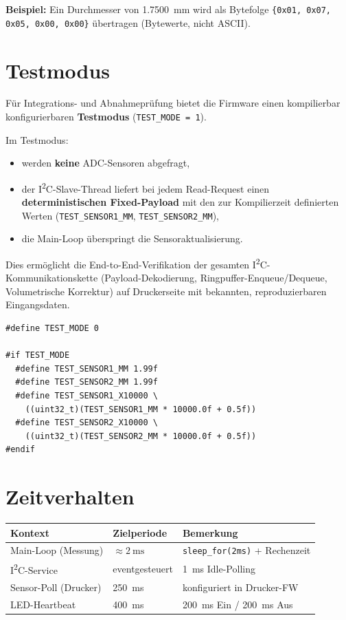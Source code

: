 \textbf{Beispiel:} Ein Durchmesser von \qty{1,7500}{\milli\meter} wird als Bytefolge \texttt{\{0x01, 0x07, 0x05, 0x00, 0x00\}} übertragen (Bytewerte, nicht ASCII).

\section{Testmodus}
\label{sec:sensor_testmodus}

Für Integrations- und Abnahmeprüfung bietet die Firmware einen kompilierbar konfigurierbaren \textbf{Testmodus} (\texttt{TEST\_MODE~=~1}).

Im Testmodus:
\begin{itemize}
  \item werden \textbf{keine} ADC-Sensoren abgefragt,
  \item der I\textsuperscript{2}C-Slave-Thread liefert bei jedem Read-Request einen \textbf{deterministischen Fixed-Payload} mit den zur Kompilierzeit definierten Werten (\texttt{TEST\_SENSOR1\_MM}, \texttt{TEST\_SENSOR2\_MM}),
  \item die Main-Loop überspringt die Sensoraktualisierung.
\end{itemize}

Dies ermöglicht die End-to-End-Verifikation der gesamten I\textsuperscript{2}C-Kommunikationskette (Payload-Dekodierung, Ringpuffer-Enqueue/Dequeue, Volumetrische Korrektur) auf Druckerseite mit bekannten, reproduzierbaren Eingangsdaten.

\begin{lstlisting}[style=firmwarestyle, caption={Testmodus-Konfiguration (\texttt{main.cpp}, Z.~56--63).}, label={lst:sensor_test_mode}]
#define TEST_MODE 0

#if TEST_MODE
  #define TEST_SENSOR1_MM 1.99f
  #define TEST_SENSOR2_MM 1.99f
  #define TEST_SENSOR1_X10000 \
    ((uint32_t)(TEST_SENSOR1_MM * 10000.0f + 0.5f))
  #define TEST_SENSOR2_X10000 \
    ((uint32_t)(TEST_SENSOR2_MM * 10000.0f + 0.5f))
#endif
\end{lstlisting}

\section{Zeitverhalten}
\label{sec:sensor_timing}

\begin{center}
  \begin{tabular}{l l l}
    \toprule
    Kontext & Zielperiode & Bemerkung \\
    \midrule
    Main-Loop (Messung) & $\approx \qty{2}{\milli\second}$ & \texttt{sleep\_for(2ms)} + Rechenzeit \\
    I\textsuperscript{2}C-Service & eventgesteuert & \qty{1}{\milli\second} Idle-Polling \\
    Sensor-Poll (Drucker) & \qty{250}{\milli\second} & konfiguriert in Drucker-FW \\
    LED-Heartbeat & \qty{400}{\milli\second} & \qty{200}{\milli\second} Ein / \qty{200}{\milli\second} Aus \\
    \bottomrule
  \end{tabular}
\end{center}

